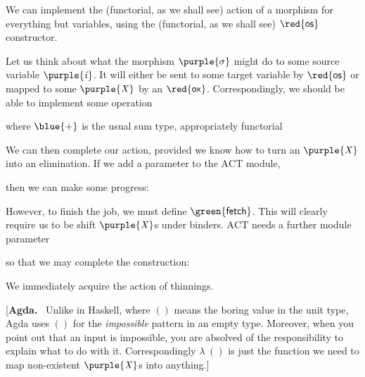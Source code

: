 \documentclass[natbib]{article}
\makeatletter
\newcommand{\anonymous}{\kern0.06em \vbox{\hrule\@width.5em}}
\def\resethooks{%
  \global\let\SaveRestoreHook\empty
  \global\let\ColumnHook\empty}
\let\hspre\empty
\let\hspost\empty
\newcommand{\D}[1]{\blue{\mathsf{#1}}}
\newcommand{\C}[1]{\red{\mathsf{#1}}}
\newcommand{\F}[1]{\green{\mathsf{#1}}}
\newcommand{\V}[1]{\purple{\mathit{#1}}}
\newcommand{\agdanote}[1]{[\textbf{Agda.}~ #1]}
\makeatother
\begin{document}
We can implement the (functorial, as we shall see) action of a
morphism for everything but variables, using the (functorial, as we
shall see) \ensuremath{\C{os}} constructor.

Let us think about what the morphism \ensuremath{\V{\sigma}} might do to some source variable \ensuremath{\V{i}}.
It will either be sent to some target variable by \ensuremath{\C{os}} or mapped to some \ensuremath{\V{X}} by an
\ensuremath{\C{ox}}. Correspondingly, we should be able to implement some operation

\usebox{\fetchTybox}

where \ensuremath{\D{+}} is the usual sum type, appropriately functorial

\usebox{\plusbox}

We can then complete our action, provided we know how to turn an \ensuremath{\V{X}} into an
elimination. If we add a parameter to the \ensuremath{\mathrm{ACT}} module,

\usebox{\tmXbox}

then we can make some progress:

\usebox{\vabox}

However, to finish the job, we must define \ensuremath{\F{fetch}}. This will clearly require us
to be shift \ensuremath{\V{X}}s under binders. \ensuremath{\mathrm{ACT}} needs a further module parameter

\usebox{\wkXbox}

so that we may complete the construction:

\usebox{\fetchbox}

We immediately acquire the action of thinnings.
\resethooks

\agdanote{Unlike in Haskell, where \ensuremath{()} means the boring value in the unit type,
Agda uses \ensuremath{()} for the \emph{impossible} pattern in an empty type. Moreover, when
you point out that an input is impossible, you are absolved of the responsibility
to explain what to do with it. Correspondingly \ensuremath{\lambda \;()} is just the function we need
to map non-existent \ensuremath{\V{X}}s into anything.}
\end{document}
